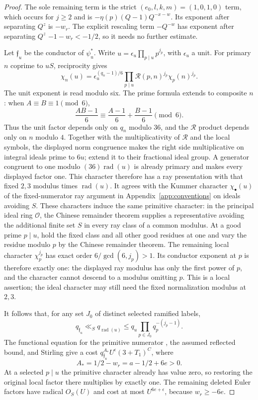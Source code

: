 \documentclass[12pt]{article}
\begin{document}
\begin{proof}
The sole remaining term is the strict
$(e_0,l,k,m)=(1,0,1,0)$ term, which occurs for $j\ge2$ and is
$-\eta(p)(Q-1)Q^{-x-w}$.  Its exponent after separating $Q^z$ is $-w_r$.
The explicit rescaling term $-Q^{-w}$ has exponent after separating $Q^z$
$-1-w_r<-1/2$, so it needs no further estimate.

Let $\mathfrak f_u$ be the conductor of $\psi_u^*$.  Write
$u=\epsilon_u\prod_{p\mid u}p^{j_p}$, with $\epsilon_u$ a unit.
For primary $n$ coprime to $uS$, reciprocity gives
\[
 \chi_n(u)=\epsilon_u^{(q_n-1)/6}
       \prod_{p\mid u}\mathcal R(p,n)^{j_p}\chi_p(n)^{j_p}.
\]
The unit exponent is read modulo six.  The prime formula extends to
composite $n$: when $A\equiv B\equiv1\pmod6$,
\[
 \frac{AB-1}{6}\equiv\frac{A-1}{6}+\frac{B-1}{6}\pmod6.
\]
Thus the unit factor depends only on $q_n$ modulo $36$, and the
$\mathcal R$ product depends only on $n$ modulo $4$.  Together with
the multiplicativity of $\mathcal R$ and the local symbols, the
displayed norm congruence makes the right side multiplicative on
integral ideals prime to $6u$; extend it to their fractional ideal
group.  A generator congruent to one modulo
$(36)\operatorname{rad}(u)$ is already primary and makes every
displayed factor one.  This character therefore has a ray
presentation with that fixed $2,3$ modulus times
$\operatorname{rad}(u)$.  It agrees with the Kummer character
$\chi_\bullet(u)$ of the fixed-numerator ray argument in Appendix~\ref{app:conventions} on ideals
avoiding $S$.  These characters induce
the same primitive character: in the principal ideal ring
$\mathcal O$, the Chinese remainder theorem supplies a representative
avoiding the additional finite set $S$ in every ray class of a
common modulus.  At a good prime
$p\mid u$, hold the fixed class and all other good residues at one
and vary the residue modulo $p$ by the Chinese remainder theorem.
The remaining local character $\chi_p^{j_p}$ has exact order
$6/\gcd(6,j_p)>1$.  Its conductor exponent at $p$ is therefore
exactly one: the displayed ray modulus has only the first power of
$p$, and the character cannot descend to a modulus omitting $p$.
This is a local assertion; the ideal character may still need the
fixed normalization modulus at $2,3$.

It follows that, for any set $J_0$ of distinct selected ramified
labels,
\begin{equation}\label{old-eq:5.13d}
 q_{\mathfrak f_u}\ll_S q_{\operatorname{rad}(u)}
       \le q_u\prod_{p\in J_0}q_p^{-(j_p-1)}.
\end{equation}
The functional equation for the primitive numerator
\cite[Theorem 5.22 and Section 5.11]{Poonen}, the assumed reflected bound, and Stirling
give a cost
$q_{\mathfrak f_u}^{A_*}U^\epsilon(3+T_1)^C$, where
\[
 A_*=1/2-w_r=a-1/2+6e>0.
\]
At a selected $p\mid u$ the primitive character already has value
zero, so restoring the original local factor there multiplies by
exactly one.  The remaining deleted Euler factors have radical
$O_S(U)$ and cost at most $U^{6e+\epsilon}$, because $w_r\ge-6e$.


\end{proof}
\end{document}
